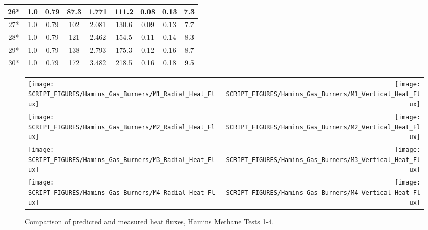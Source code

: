 \begin{table}[!ht]
\begin{center}
\begin{tabular}{|c|c|c|c|c|c|c||c|c|}
26*       & 1.0      & 0.79       & 87.3        &  1.771                &  111.2         & 0.08          & 0.13       & 7.3       \\ \hline
27*       & 1.0      & 0.79       & 102         &  2.081                &  130.6         & 0.09          & 0.13       & 7.7       \\ \hline
28*       & 1.0      & 0.79       & 121         &  2.462                &  154.5         & 0.11          & 0.14       & 8.3       \\ \hline
29*       & 1.0      & 0.79       & 138         &  2.793                &  175.3         & 0.12          & 0.16       & 8.7       \\ \hline
30*       & 1.0      & 0.79       & 172         &  3.482                &  218.5         & 0.16          & 0.18       & 9.5       \\ \hline
\end{tabular}
\end{center}
\label{Hamins_Methane_Table}
\end{table}

\newpage

\begin{figure}[p]
\begin{tabular*}{\textwidth}{l@{\extracolsep{\fill}}r}
\texttt{[image: SCRIPT\_FIGURES/Hamins\_Gas\_Burners/M1\_Radial\_Heat\_Flux]} &
\texttt{[image: SCRIPT\_FIGURES/Hamins\_Gas\_Burners/M1\_Vertical\_Heat\_Flux]} \\
\texttt{[image: SCRIPT\_FIGURES/Hamins\_Gas\_Burners/M2\_Radial\_Heat\_Flux]} &
\texttt{[image: SCRIPT\_FIGURES/Hamins\_Gas\_Burners/M2\_Vertical\_Heat\_Flux]} \\
\texttt{[image: SCRIPT\_FIGURES/Hamins\_Gas\_Burners/M3\_Radial\_Heat\_Flux]} &
\texttt{[image: SCRIPT\_FIGURES/Hamins\_Gas\_Burners/M3\_Vertical\_Heat\_Flux]} \\
\texttt{[image: SCRIPT\_FIGURES/Hamins\_Gas\_Burners/M4\_Radial\_Heat\_Flux]} &
\texttt{[image: SCRIPT\_FIGURES/Hamins\_Gas\_Burners/M4\_Vertical\_Heat\_Flux]}
\end{tabular*}
\label{Hamins_Methane_1-4}
\caption[Heat flux predictions, Hamins methane burner Tests 1-4]
{Comparison of predicted and measured heat fluxes, Hamins Methane Tests 1-4.}
\end{figure}

